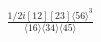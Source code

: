 \documentclass[varwidth, border=5pt]{standalone}
\begin{document}
\begin{my}
$\begin{gathered}
\scriptscriptstyle\frac{1/2i[12][23]\langle56\rangle^3}{\langle16\rangle\langle34\rangle\langle45\rangle}
\end{gathered}$
\end{my}
\end{document}
